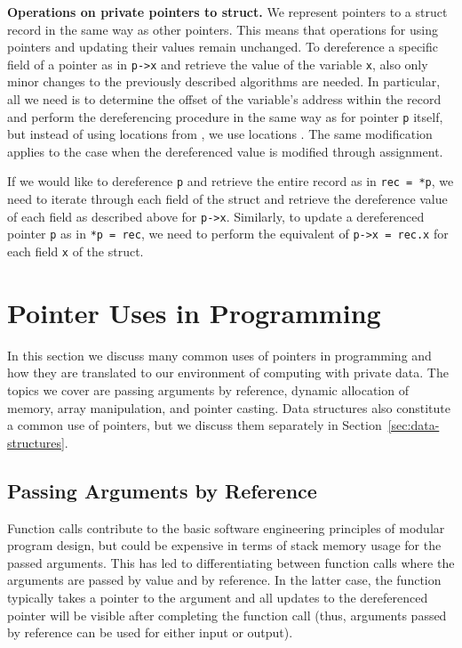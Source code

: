 \documentclass[11pt]{article}
\begin{document}
\medskip \noindent \textbf{Operations on private pointers to struct.} We
represent pointers to a struct record in the same way as other pointers.
This means that operations for using pointers and updating their values
remain unchanged. To dereference a specific field of a pointer as in
\texttt{p->x} and retrieve the value of the variable \texttt{x}, also only
minor changes to the previously described algorithms are needed. In
particular, all we need is to determine the offset  of the variable's
address within the record and perform the dereferencing procedure in the
same way as for pointer \texttt{p} itself, but instead of using locations
 from , we use locations . The same modification
applies to the case when the dereferenced value is modified through
assignment. 

If we would like to dereference \texttt{p} and retrieve the entire record as
in \texttt{rec = *p}, we need to iterate through each field of the struct
and retrieve the dereference value of each field as described above for
\texttt{p->x}. Similarly, to update a dereferenced pointer \texttt{p} as in 
\texttt{*p = rec}, we need to perform the equivalent of \texttt{p->x =
rec.x} for each field \texttt{x} of the struct.

\section{Pointer Uses in Programming} \label{sec:pointer-uses} 

In this section we discuss many common uses of pointers in programming and
how they are translated to our environment of computing with private data.
The topics we cover are passing arguments by reference, dynamic allocation
of memory, array manipulation, and pointer casting. Data structures also
constitute a common use of pointers, but we discuss them separately in
Section~\ref{sec:data-structures}.

\subsection{Passing Arguments by Reference}

Function calls contribute to the basic software engineering principles of
modular program design, but could be expensive in terms of stack memory
usage for the passed arguments. This has led to differentiating between
function calls where the arguments are passed by value and by reference. In
the latter case, the function typically takes a pointer to the argument and
all updates to the dereferenced pointer will be visible after completing the
function call (thus, arguments passed by reference can be used for either
input or output).
\end{document}
